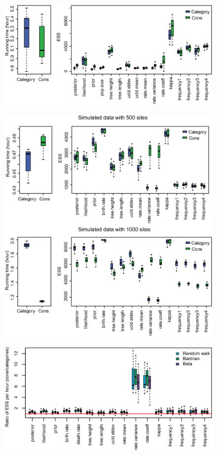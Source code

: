 \documentclass{bmcart}
\begin{document}
\begin{backmatter}
\begin{figure}[h!]
\includegraphics[width=12cm]{ShankarappaTimeEss.eps}\\
\caption{}
\label{shankarappatimeess}
\end{figure}

\begin{figure}[h!]
\includegraphics[width=12cm]{SimulatedTimeEss.eps}\\
\caption{}
\label{simulatedtimeess}
\end{figure}

\begin{figure}[h!]
\includegraphics[width=12cm]{AnolisProposal.eps}\\
\caption{}
\label{anolisproposal}
\end{figure}


\end{backmatter}
\end{document}
